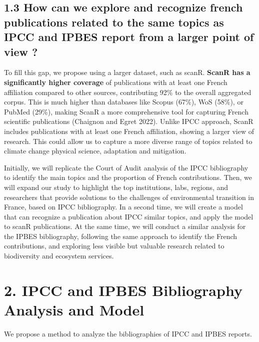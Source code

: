 \documentclass[
]{article}
\begin{document}
\hypertarget{how-can-we-explore-and-recognize-french-publications-related-to-the-same-topics-as-ipcc-and-ipbes-report-from-a-larger-point-of-view}{%
\subsection{1.3 How can we explore and recognize french publications
related to the same topics as IPCC and IPBES report from a larger point
of view
?}\label{how-can-we-explore-and-recognize-french-publications-related-to-the-same-topics-as-ipcc-and-ipbes-report-from-a-larger-point-of-view}}

To fill this gap, we propose using a larger dataset, such as scanR.
\textbf{ScanR has a significantly higher coverage} of publications with
at least one French affiliation compared to other sources, contributing
92\% to the overall aggregated corpus. This is much higher than
databases like Scopus (67\%), WoS (58\%), or PubMed (29\%), making ScanR
a more comprehensive tool for capturing French scientific publications
(Chaignon and Egret 2022). Unlike IPCC approach, ScanR includes
publications with at least one French affiliation, showing a larger view
of research. This could allow us to capture a more diverse range of
topics related to climate change physical science, adaptation and
mitigation.

Initially, we will replicate the Court of Audit analysis of the IPCC
bibliography to identify the main topics and the proportion of French
contributions. Then, we will expand our study to highlight the top
institutions, labs, regions, and researchers that provide solutions to
the challenges of environmental transition in France, based on IPCC
bibliography. In a second time, we will create a model that can
recognize a publication about IPCC similar topics, and apply the model
to scanR publications. At the same time, we will conduct a similar
analysis for the IPBES bibliography, following the same approach to
identify the French contributions, and exploring less visible but
valuable research related to biodiversity and ecosystem services.

\hypertarget{ipcc-and-ipbes-bibliography-analysis-and-model}{%
\section{2. IPCC and IPBES Bibliography Analysis and
Model}\label{ipcc-and-ipbes-bibliography-analysis-and-model}}

We propose a method to analyze the bibliographies of IPCC and IPBES
reports.
\end{document}
